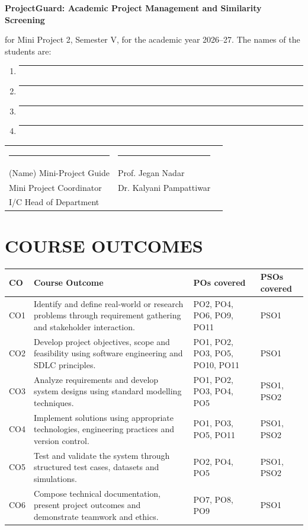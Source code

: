\documentclass[12pt,a4paper]{article}
\newcommand{\ProjectTitle}{ProjectGuard: Academic Project Management and Similarity Screening}
\newcommand{\MemberOne}{\rule{6cm}{0.4pt}}
\newcommand{\MemberTwo}{\rule{6cm}{0.4pt}}
\newcommand{\MemberThree}{\rule{6cm}{0.4pt}}
\newcommand{\MemberFour}{\rule{6cm}{0.4pt}}
\begin{document}
\vspace{0.4cm}
\begin{center}\textbf{\ProjectTitle}\end{center}
\vspace{0.4cm}
for Mini Project 2, Semester V, for the academic year 2026--27. The names of the students are:
\begin{enumerate}[leftmargin=1.8em,itemsep=0.5em]
\item \MemberOne
\item \MemberTwo
\item \MemberThree
\item \MemberFour
\end{enumerate}
\vfill
\begin{tabularx}{\textwidth}{>{\centering\arraybackslash}X>{\centering\arraybackslash}X>{\centering\arraybackslash}X}
\rule{0.8\linewidth}{0.4pt} & \rule{0.8\linewidth}{0.4pt} & \rule{0.8\linewidth}{0.4pt}\\
(Name) Mini-Project Guide & Prof. Jegan Nadar\\Mini Project Coordinator & Dr. Kalyani Pampattiwar\\I/C Head of Department
\end{tabularx}
\clearpage

\section*{COURSE OUTCOMES}
\footnotesize
\begin{tabularx}{\textwidth}{|p{}|X|p{}|p{}|}
\hline
\textbf{CO} & \textbf{Course Outcome} & \textbf{POs covered} & \textbf{PSOs covered}\\\hline
CO1 & Identify and define real-world or research problems through requirement gathering and stakeholder interaction. & PO2, PO4, PO6, PO9, PO11 & PSO1\\\hline
CO2 & Develop project objectives, scope and feasibility using software engineering and SDLC principles. & PO1, PO2, PO3, PO5, PO10, PO11 & PSO1\\\hline
CO3 & Analyze requirements and develop system designs using standard modelling techniques. & PO1, PO2, PO3, PO4, PO5 & PSO1, PSO2\\\hline
CO4 & Implement solutions using appropriate technologies, engineering practices and version control. & PO1, PO3, PO5, PO11 & PSO1, PSO2\\\hline
CO5 & Test and validate the system through structured test cases, datasets and simulations. & PO2, PO4, PO5 & PSO1, PSO2\\\hline
CO6 & Compose technical documentation, present project outcomes and demonstrate teamwork and ethics. & PO7, PO8, PO9 & PSO1\\\hline
\end{tabularx}
\normalsize
\clearpage
\end{document}
